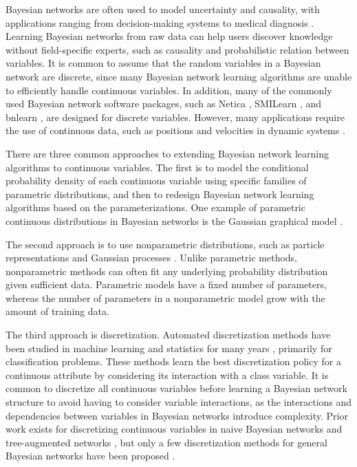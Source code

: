 \documentclass[twoside,11pt]{article}
\newcommand{\citep}[1]{\cite{#1}}
\begin{document}
Bayesian networks \citep{Pearl_1988,PGM_2009} are often used to model uncertainty and causality, with applications ranging from decision-making systems \citep{kochenderfer2012next} to medical diagnosis \citep{Lustgarten_2011}. Learning Bayesian networks from raw data can help users discover knowledge without field-specific experts, such as causality and probabilistic relation between variables. It is common to assume that the random variables in a Bayesian network are discrete, since many Bayesian network learning algorithms are unable to efficiently handle continuous variables. In addition, many of the commonly used Bayesian network software packages, such as Netica \citep{netica1992}, SMILearn \citep{druzdzel1999smile}, and bnlearn \citep{bnlearn2010}, are designed for discrete variables. However, many applications require the use of continuous data, such as positions and velocities in dynamic systems \citep{kochenderfer2010airspace}.


There are three common approaches to extending Bayesian network learning algorithms to continuous variables. The first is to model the conditional probability density of each continuous variable using specific families of parametric distributions, and then to redesign Bayesian network learning algorithms based on the parameterizations. One example of parametric continuous distributions in Bayesian networks is the Gaussian graphical model \citep{Weiss_2011}.


The second approach is to use nonparametric distributions, such as particle representations and Gaussian processes \citep{Ickstadt_2010}.
Unlike parametric methods, nonparametric methods can often fit any underlying probability distribution given sufficient data.
Parametric models have a fixed number of parameters, whereas the number of parameters in a nonparametric model grow with the amount of training data.

The third approach is discretization.
Automated discretization methods have been studied in machine learning and statistics for many years \citep{Dougherty_1995,Kerber_1992,Holte_1993,Fayyad_1993}, primarily for classification problems.
These methods learn the best discretization policy for a continuous attribute by considering its interaction with a class variable.
It is common to discretize all continuous variables before learning a Bayesian network structure to avoid having to consider variable interactions, as the interactions and dependencies between variables in Bayesian networks introduce complexity.
Prior work exists for discretizing continuous variables in naive Bayesian networks and tree-augmented networks \citep{Fried_naive}, but only a few discretization methods for general Bayesian networks have been proposed \citep{Friedman_1996,Kozlov_1997,Monti_1998,Steck_2007}.
\end{document}
